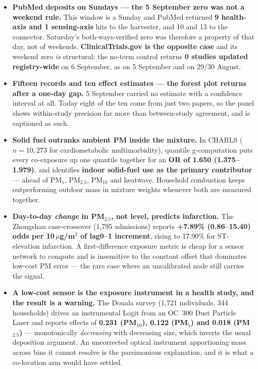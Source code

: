 \documentclass[10pt]{article}
\begin{document}
\footnotesize
\begin{itemize}
\item \textbf{PubMed deposits on Sundays --- the 5 September zero was not a weekend rule.}
This window is a Sunday and PubMed returned \textbf{9 health-axis and 1 sensing-axis} hits
to the harvester, and 10 and 13 to the connector. Saturday's both-ways-verified zero was
therefore a property of that day, not of weekends. \textbf{ClinicalTrials.gov is the
opposite case} and its weekend zero \emph{is} structural: the no-term control returns
\textbf{0 studies updated registry-wide} on 6 September, as on 5 September and on
29/30 August.

\item \textbf{Fifteen records and ten effect estimates --- the forest plot returns after a
one-day gap.} 5 September carried no estimate with a confidence interval at all. Today
eight of the ten come from just two papers, so the panel shows within-study precision far
more than between-study agreement, and is captioned as such.

\item \textbf{Solid fuel outranks ambient PM inside the mixture.} In CHARLS
($n=10{,}273$ for cardiometabolic multimorbidity), quantile g-computation puts every
co-exposure up one quantile together for an \textbf{OR of 1.650 (1.375--1.979)}, and
identifies \textbf{indoor solid-fuel use as the primary contributor} --- ahead of PM$_1$,
PM$_{2.5}$, PM$_{10}$ and heatwave. Household combustion keeps outperforming outdoor mass
in mixture weights whenever both are measured together.

\item \textbf{Day-to-day \emph{change} in PM$_{2.5}$, not level, predicts infarction.}
The Zhongshan case-crossover (1{,}795 admissions) reports \textbf{+7.89\%
(0.86--15.40) odds per 10\,$\mu$g/m$^3$ of lag0--1 increment}, rising to 17.90\% for
ST-elevation infarction. A first-difference exposure metric is cheap for a sensor network
to compute and is insensitive to the constant offset that dominates low-cost PM error ---
the rare case where an uncalibrated node still carries the signal.

\item \textbf{A low-cost sensor is the exposure instrument in a health study, and the
result is a warning.} The Douala survey (1{,}721 individuals, 344 households) drives an
instrumental Logit from an OC~300 Dust Particle Laser and reports effects of
\textbf{0.231 (PM$_{10}$), 0.122 (PM$_5$) and 0.018 (PM$_{2.5}$)} --- monotonically
\emph{decreasing} with decreasing size, which inverts the usual deposition argument. An
uncorrected optical instrument apportioning mass across bins it cannot resolve is the
parsimonious explanation, and it is what a co-location arm would have settled.


\end{itemize}
\end{document}

